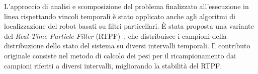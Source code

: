 \documentclass[11pt]{article}
\begin{document}
L'approccio di analisi e scomposizione del problema finalizzato all'esecuzione in linea rispettando vincoli temporali \`e stato applicato anche agli algoritmi di localizzazione del robot basati su filtri particellari. 
\`E stata proposta una variante del \emph{Real-Time Particle Filter} (RTPF)~\cite{lodirizzini2007icinco,lodirizzini2007ecmr,lodirizzini2008improved}, che distribuisce i campioni della distribuzione dello stato del sistema su diversi intervalli temporali. 
Il contributo originale consiste nel metodo di calcolo dei pesi per il ricampionamento dai campioni riferiti a diversi intervalli, migliorando la stabilit\`a del RTPF. 




\end{document}
